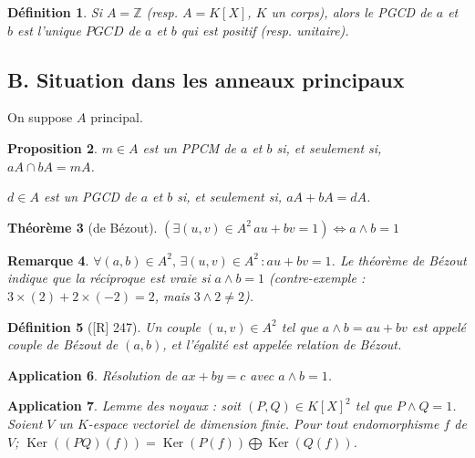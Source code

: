 \documentclass[10pt, a4paper, parskip=full, twoside, twocolumn]{report}
\newtheorem{definition}{Définition}
\newtheorem{theorem}[definition]{Théorème}
\newtheorem{proposition}[definition]{Proposition}
\newtheorem{remark}[definition]{Remarque}
\newtheorem{application}[definition]{Application}
\newcommand{\IZ}{\mathbb{Z}}
\DeclareMathOperator{\Ker}{Ker}
\begin{document}
\begin{definition}
	Si $A = \IZ$ (resp. $A=K[X]$, $K$ un corps), alors
	le PGCD de $a$ et $b$ est l'unique $PGCD$ de $a$ et $b$ qui est positif (resp. unitaire).
\end{definition}

\subsection*{B. Situation dans les anneaux principaux}
\textcolor{paragraphtext}{On suppose $A$ principal.}

\begin{proposition}
	$m\in A$ est un PPCM de $a$ et $b$ si, et seulement si, $aA\cap bA = mA$.

	$d\in A$ est un PGCD de $a$ et $b$ si, et seulement si, $aA + bA = dA$.
\end{proposition}

\begin{theorem}[de Bézout]
	$\left(\exists(u,v)\in A^2\, au+bv = 1\right)\iff a\wedge b = 1$
\end{theorem}

\begin{remark}
	$\forall(a,b)\in A^2,\, \exists(u,v)\in A^2\, \colon au+bv = 1$. Le théorème de Bézout
	indique que la réciproque est vraie si $a\wedge b = 1$ (contre-exemple : $3\times (2) + 2 \times (-2) = 2$, mais $3\wedge 2 \neq 2$).
\end{remark}

\begin{definition}[\textnormal{[R] 247}]
	Un couple $(u,v)\in A^2$ tel que $a\wedge b = au+bv$ est appelé \emph{couple de Bézout de $(a,b)$}, et l'égalité est appelée \emph{relation de Bézout}.
\end{definition}

\begin{application}
	Résolution de $ax + by=c$ avec $a\wedge b = 1$.
\end{application}

\begin{application}
	Lemme des noyaux : soit $(P,Q)\in K[X]^2$ tel que $P\wedge Q = 1$.
	Soient $V$ un $K$-espace vectoriel de dimension finie. Pour tout endomorphisme $f$ de $V$;
	$\Ker\left(\left(PQ\right)\left(f\right)\right) = \Ker\left(P(f)\right)\bigoplus\Ker\left(Q(f)\right)$.
\end{application}
\end{document}

